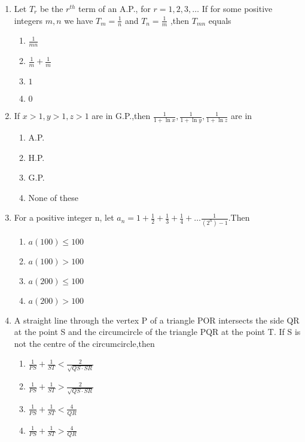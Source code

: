\documentclass[journal,12pt,twocolumn]{IEEEtran}
\theoremstyle{remark}
\begin{document}
\begin{enumerate}
\item Let $T_r$ be the $r^{th}$ term of an A.P., for $r=1,2,3,\dots$ If for some positive integers $m,n$ we have
$T_m=\frac{1}{n}$ and $T_n=\frac{1}{m}$ ,then $T_{mn}$ equals \hfill{}
\begin{multicols}{2}
\begin{enumerate}
\item $\frac{1}{mn}$
\item $\frac{1}{m} + \frac{1}{m}$
\item $1$
\item $0$
\end{enumerate}
\end{multicols}

\item If $x>1,y>1,z>1$ are in G.P.,then $\frac{1}{1+\ln x},\frac{1}{1+\ln y},\frac{1}{1+\ln z}$ are in 
\hfill{}
\begin{multicols}{2}
\begin{enumerate}
\item A.P.
\item H.P.
\item G.P.
\item None of these
\end{enumerate}
\end{multicols}

\item For a positive integer n, let
$a_n=1+\frac{1}{2}+\frac{1}{3}+\frac{1}{4}+\dots\frac{1}{(2^n)-1}$.Then \hfill{}
\begin{multicols}{2}
\begin{enumerate}
\item $a(100)\leq 100$
\item $a(100) > 100$
\item $a(200)\leq 100$
\item $a(200) > 100$
\end{enumerate}
\end{multicols}

\item A straight line through the vertex P of a triangle POR intersects the side QR at the point S and the circumcircle of the triangle PQR at the point T. If S is not the centre of the circumcircle,then  \hfill{}
\begin{multicols}{2}
\begin{enumerate}
\item $\frac{1}{PS}+\frac{1}{ST}<\frac{2}{\sqrt{QS \cdot SR}}$
\item $\frac{1}{PS}+\frac{1}{ST}>\frac{2}{\sqrt{QS \cdot SR}}$
\item $\frac{1}{PS}+\frac{1}{ST}<\frac{4}{QR}$
\item $\frac{1}{PS}+\frac{1}{ST}>\frac{4}{QR}$
\end{enumerate}
\end{multicols}


\end{enumerate}
\end{document}
